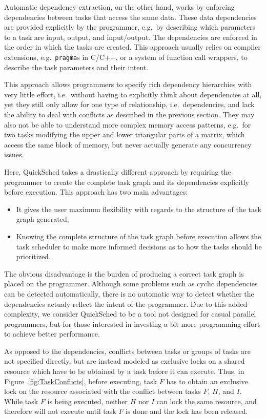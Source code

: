 \documentclass[preprint]{elsarticle}
\newcommand{\fig}[1]
    {Figure~\ref{fig:#1}}
\begin{document}
Automatic dependency extraction, on the other hand,
works by enforcing dependencies
between tasks that access the same data.
These data dependencies are provided explicitly by the programmer, e.g.~by
describing which parameters to a task are input, output, and input/output.
The dependencies are enforced in the order in which the tasks are 
created.
This approach usually relies on compiler extensions, e.g.~{\tt pragma}s
in C/C++, or a system of function call wrappers, to describe the task parameters
and their intent.

This approach allows programmers to specify rich dependency hierarchies
with very little effort, i.e.~without having to explicitly think about
dependencies at all, yet they still only allow for one type of relationship,
i.e.~dependencies, and lack the ability to deal with conflicts as
described in the previous section.
They may also not be able to understand more complex memory access patterns,
e.g.~for two tasks modifying the upper and lower triangular parts of a matrix,
which access the same block of memory, but never actually generate any
concurrency issues.


Here, QuickSched takes a drastically different approach by requiring
the programmer to create the complete task graph and its dependencies
explicitly before execution.
This approach has two main advantages:
\begin{itemize}
  \item It gives the user maximum flexibility with regards to the
    structure of the task graph generated,
  \item Knowing the complete structure of the task graph before execution
    allows the task scheduler to make more informed decisions
    as to how the tasks should be prioritized.
\end{itemize}

\noindent The obvious disadvantage is the burden of producing a correct
task graph is placed on the programmer.
Although some problems such as cyclic dependencies can be detected
automatically, there is no automatic way to detect whether the
dependencies actualy reflect the intent of the programmer.
Due to this added complexity, we consider QuickSched to be
a tool not designed for casual parallel programmers, but for 
those interested in investing a bit more programming effort to achieve
better performance.

As opposed to the dependencies,
conflicts between tasks or groups of tasks are not specified directly,
but are instead modeled as exclusive locks on a shared resource
which have to be obtained by a task before it can execute.
Thus, in \fig{TaskConflicts}, before executing, task $F$ has
to obtain an exclusive lock on the resource associated with
the conflict between tasks $F$, $H$, and $I$.
While task $F$ is being executed, neither $H$ nor $I$ can 
lock the same resource, and therefore will not execute until
task $F$ is done and the lock has been released.
\end{document}
